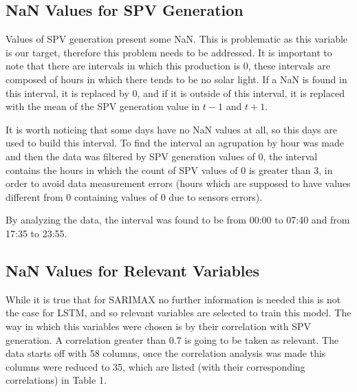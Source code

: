 \documentclass[a4paper,12pt]{article}
\begin{document}
\subsection{NaN Values for SPV Generation}
Values of SPV generation present some NaN. This is problematic as this variable is our target, therefore this problem needs to be addressed. It is important to note that there are intervals in which this production is 0, these intervals are composed of hours in which there tends to be no solar light. If a NaN is found in this interval, it is replaced by 0, and if it is outside of this interval, it is replaced with the mean of the SPV generation value in \(t-1\) and \(t+1\). 

It is worth noticing that some days have no NaN values at all, so this days are used to build this interval. To find the interval an agrupation by hour was made and then the data was filtered by SPV generation values of 0, the interval contains the hours in which the count of SPV values of 0 is greater than 3, in order to avoid data measurement errors (hours which are supposed to have values different from 0 containing values of 0 due to sensors errors).

By analyzing the data, the interval was found to be from 00:00 to 07:40 and from 17:35 to 23:55.

\subsection{NaN Values for Relevant Variables}
While it is true that for SARIMAX no further information is needed this is not the case for LSTM, and so relevant variables are selected to train this model. The way in which this variables were chosen is by their correlation with SPV generation. A correlation greater than 0.7 is going to be taken as relevant. The data starts off with 58 columns, once the correlation analysis was made this columns were reduced to 35, which are listed (with their corresponding correlations) in Table 1.
\end{document}

